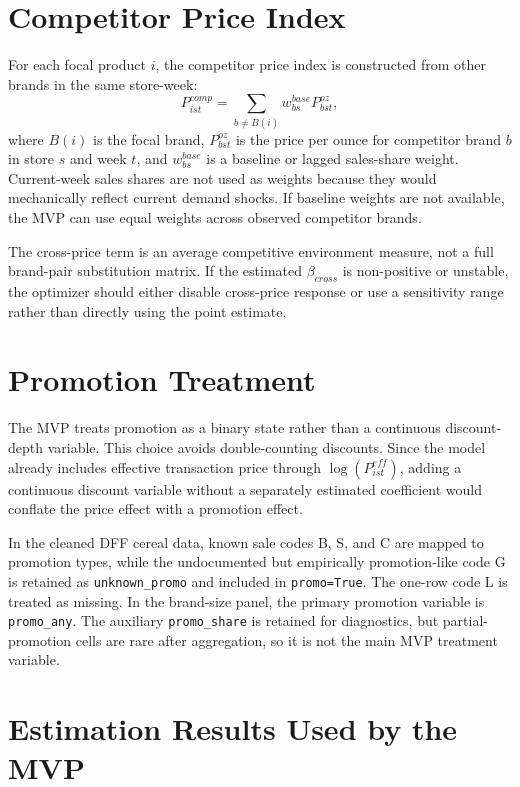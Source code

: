 \documentclass[11pt]{article}
\begin{document}
\section{Competitor Price Index}

For each focal product $i$, the competitor price index is constructed from other brands in the same store-week:
\begin{equation}
P^{comp}_{ist}=\sum_{b\ne B(i)} w^{base}_{bs}P^{oz}_{bst},
\label{eq:comp-price}
\end{equation}
where $B(i)$ is the focal brand, $P^{oz}_{bst}$ is the price per ounce for competitor brand $b$ in store $s$ and week $t$, and $w^{base}_{bs}$ is a baseline or lagged sales-share weight. Current-week sales shares are not used as weights because they would mechanically reflect current demand shocks. If baseline weights are not available, the MVP can use equal weights across observed competitor brands.

The cross-price term is an average competitive environment measure, not a full brand-pair substitution matrix. If the estimated $\beta_{cross}$ is non-positive or unstable, the optimizer should either disable cross-price response or use a sensitivity range rather than directly using the point estimate.

\section{Promotion Treatment}

The MVP treats promotion as a binary state rather than a continuous discount-depth variable. This choice avoids double-counting discounts. Since the model already includes effective transaction price through $\log(P^{eff}_{ist})$, adding a continuous discount variable without a separately estimated coefficient would conflate the price effect with a promotion effect.

In the cleaned DFF cereal data, known sale codes B, S, and C are mapped to promotion types, while the undocumented but empirically promotion-like code G is retained as \texttt{unknown\_promo} and included in \texttt{promo=True}. The one-row code L is treated as missing. In the brand-size panel, the primary promotion variable is \texttt{promo\_any}. The auxiliary \texttt{promo\_share} is retained for diagnostics, but partial-promotion cells are rare after aggregation, so it is not the main MVP treatment variable.

\section{Estimation Results Used by the MVP}
\end{document}
